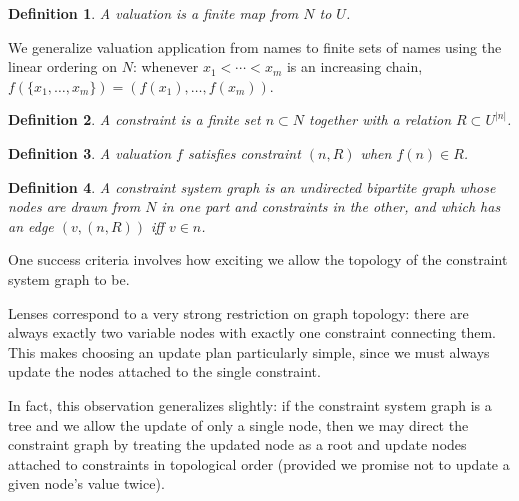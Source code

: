 \documentclass{article}
\newtheorem{definition}{Definition}
\newcommand{\defined}{\downarrow}
\begin{document}
\begin{definition}
    A \emph{valuation} is a finite map from $N$ to $U$.
\end{definition}

We generalize valuation application from names to finite sets of names using
the linear ordering on $N$: whenever $x_1 < \cdots < x_m$ is an increasing
chain, $f(\{x_1,\ldots,x_m\}) = (f(x_1),\ldots,f(x_m))$.

\begin{definition}
    A \emph{constraint} is a finite set $n \subset N$ together with a relation $R
    \subset U^{|n|}$.
\end{definition}

\begin{definition}
    A valuation $f$ \emph{satisfies} constraint $(n,R)$ when $f(n) \in R$.
\end{definition}


\begin{definition}
    A \emph{constraint system graph} is an undirected bipartite graph whose
    nodes are drawn from $N$ in one part and constraints in the other, and
    which has an edge $(v,(n,R))$ iff $v \in n$.
\end{definition}

One success criteria involves how exciting we allow the topology of the
constraint system graph to be.

Lenses correspond to a very strong restriction on graph topology: there are
always exactly two variable nodes with exactly one constraint connecting
them. This makes choosing an update plan particularly simple, since we must
always update the nodes attached to the single constraint.

In fact, this observation generalizes slightly: if the constraint system
graph is a tree and we allow the update of only a single node, then we may
direct the constraint graph by treating the updated node as a root and
update nodes attached to constraints in topological order (provided we
promise not to update a given node's value twice).
\end{document}

